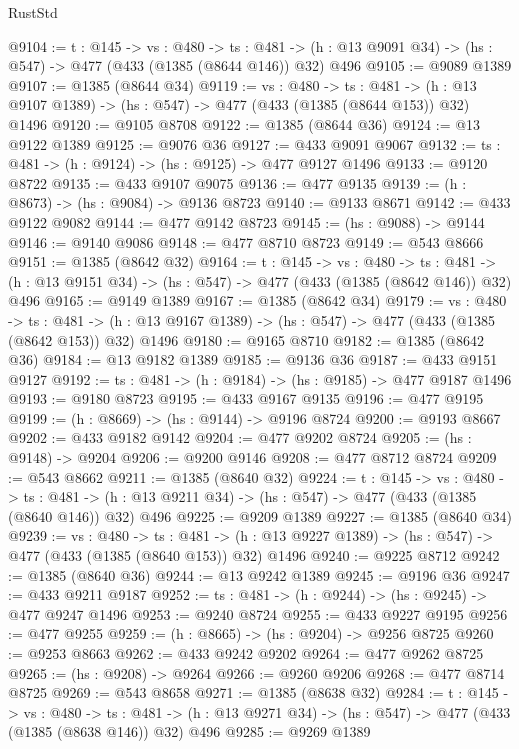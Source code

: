 \begin{lexlean}{RustStd}
\begin{coremodule}
@9104 := {t : @145} ->
  {vs : @480} ->
  {ts : @481} -> (h : @13 @9091 @34) -> (hs : @547) -> @477 (@433 (@1385 (@8644 @146)) @32) @496
@9105 := @9089 @1389
@9107 := @1385 (@8644 @34)
@9119 := {vs : @480} ->
  {ts : @481} -> (h : @13 @9107 @1389) -> (hs : @547) -> @477 (@433 (@1385 (@8644 @153)) @32) @1496
@9120 := @9105 @8708
@9122 := @1385 (@8644 @36)
@9124 := @13 @9122 @1389
@9125 := @9076 @36
@9127 := @433 @9091 @9067
@9132 := {ts : @481} -> (h : @9124) -> (hs : @9125) -> @477 @9127 @1496
@9133 := @9120 @8722
@9135 := @433 @9107 @9075
@9136 := @477 @9135
@9139 := (h : @8673) -> (hs : @9084) -> @9136 @8723
@9140 := @9133 @8671
@9142 := @433 @9122 @9082
@9144 := @477 @9142 @8723
@9145 := (hs : @9088) -> @9144
@9146 := @9140 @9086
@9148 := @477 @8710 @8723
@9149 := @543 @8666
@9151 := @1385 (@8642 @32)
@9164 := {t : @145} ->
  {vs : @480} ->
  {ts : @481} -> (h : @13 @9151 @34) -> (hs : @547) -> @477 (@433 (@1385 (@8642 @146)) @32) @496
@9165 := @9149 @1389
@9167 := @1385 (@8642 @34)
@9179 := {vs : @480} ->
  {ts : @481} -> (h : @13 @9167 @1389) -> (hs : @547) -> @477 (@433 (@1385 (@8642 @153)) @32) @1496
@9180 := @9165 @8710
@9182 := @1385 (@8642 @36)
@9184 := @13 @9182 @1389
@9185 := @9136 @36
@9187 := @433 @9151 @9127
@9192 := {ts : @481} -> (h : @9184) -> (hs : @9185) -> @477 @9187 @1496
@9193 := @9180 @8723
@9195 := @433 @9167 @9135
@9196 := @477 @9195
@9199 := (h : @8669) -> (hs : @9144) -> @9196 @8724
@9200 := @9193 @8667
@9202 := @433 @9182 @9142
@9204 := @477 @9202 @8724
@9205 := (hs : @9148) -> @9204
@9206 := @9200 @9146
@9208 := @477 @8712 @8724
@9209 := @543 @8662
@9211 := @1385 (@8640 @32)
@9224 := {t : @145} ->
  {vs : @480} ->
  {ts : @481} -> (h : @13 @9211 @34) -> (hs : @547) -> @477 (@433 (@1385 (@8640 @146)) @32) @496
@9225 := @9209 @1389
@9227 := @1385 (@8640 @34)
@9239 := {vs : @480} ->
  {ts : @481} -> (h : @13 @9227 @1389) -> (hs : @547) -> @477 (@433 (@1385 (@8640 @153)) @32) @1496
@9240 := @9225 @8712
@9242 := @1385 (@8640 @36)
@9244 := @13 @9242 @1389
@9245 := @9196 @36
@9247 := @433 @9211 @9187
@9252 := {ts : @481} -> (h : @9244) -> (hs : @9245) -> @477 @9247 @1496
@9253 := @9240 @8724
@9255 := @433 @9227 @9195
@9256 := @477 @9255
@9259 := (h : @8665) -> (hs : @9204) -> @9256 @8725
@9260 := @9253 @8663
@9262 := @433 @9242 @9202
@9264 := @477 @9262 @8725
@9265 := (hs : @9208) -> @9264
@9266 := @9260 @9206
@9268 := @477 @8714 @8725
@9269 := @543 @8658
@9271 := @1385 (@8638 @32)
@9284 := {t : @145} ->
  {vs : @480} ->
  {ts : @481} -> (h : @13 @9271 @34) -> (hs : @547) -> @477 (@433 (@1385 (@8638 @146)) @32) @496
@9285 := @9269 @1389

\end{coremodule}
\end{lexlean}
